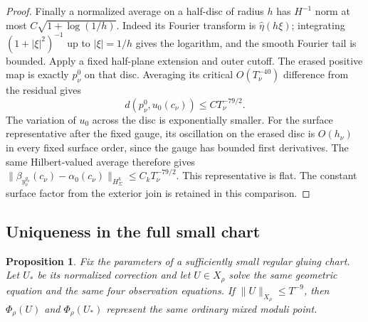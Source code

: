 \documentclass[11pt]{amsart}
\newtheorem{proposition}[theorem]{Proposition}
\theoremstyle{definition}
\theoremstyle{remark}
\theoremstyle{plain}
\begin{document}
\begin{proof}
Finally a normalized average on a half-disc of radius $h$
has $H^{-1}$ norm at most $C\sqrt{1+\log(1/h)}$.
Indeed its Fourier transform is $\widehat\eta(h\xi)$;
integrating $(1+|\xi|^2)^{-1}$ up to $|\xi|=1/h$
gives the logarithm, and the smooth Fourier tail is bounded.
Apply a fixed half-plane extension and outer cutoff.
The erased positive map is exactly $p_\nu^0$ on that disc.
Averaging its critical $O(T_\nu^{-40})$ difference from the
residual gives
\begin{equation}\label{eq:converse-attaching-rate}
                 d(p_\nu^0,u_0(c_\nu))\leq CT_\nu^{-79/2}.
\end{equation}
The variation of $u_0$ across the disc is exponentially smaller.
For the surface representative after the fixed gauge, its
oscillation on the erased disc is $O(h_\nu)$ in every fixed
surface order, since the gauge has bounded first derivatives.
The same Hilbert-valued average therefore gives
$\|\beta_{y_\nu^{g_\nu}}(c_\nu)-\alpha_0(c_\nu)\|_{H_\Sigma^k}
\leq C_kT_\nu^{-79/2}$. This representative is flat.
The constant surface factor from the exterior join is retained
in this comparison.
\end{proof}

\subsection{Uniqueness in the full small chart}

\begin{proposition}\label{prop:converse-full-chart-uniqueness}
Fix the parameters of a sufficiently small regular gluing chart.
Let $U_*$ be its normalized correction and let $U\in X_\rho$
solve the same geometric equation and the same four observation
equations. If $\|U\|_{X_\rho}\leq T^{-9}$, then
$\Phi_\rho(U)$ and $\Phi_\rho(U_*)$ represent the same ordinary
mixed moduli point.
\end{proposition}
\end{document}
